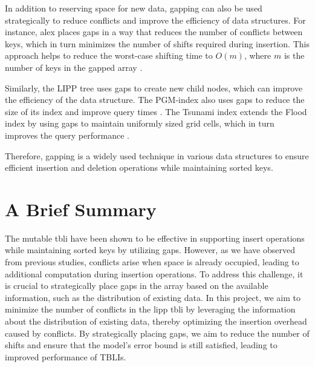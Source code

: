 In addition to reserving space for new data, gapping can also be used strategically to reduce conflicts and improve the efficiency of data structures. For instance, \acrshort{alex} places gaps in a way that reduces the number of conflicts between keys, which in turn minimizes the number of shifts required during insertion. This approach helps to reduce the worst-case shifting time to $O(m)$, where $m$ is the number of keys in the gapped array \cite{ALEX}.

Similarly, the LIPP tree \cite{LIPP} uses gaps to create new child nodes, which can improve the efficiency of the data structure. The PGM-index also uses gaps to reduce the size of its index and improve query times \cite{PGM}. The Tsunami index extends the Flood index by using gaps to maintain uniformly sized grid cells, which in turn improves the query performance \cite{Tsunami}.

Therefore, gapping is a widely used technique in various data structures to ensure efficient insertion and deletion operations while maintaining sorted keys.

\section{A Brief Summary}
The mutable \acrfull{tbli} have been shown to be effective in supporting insert operations while maintaining sorted keys by utilizing gaps. However, as we have observed from previous studies, conflicts arise when space is already occupied, leading to additional computation during insertion operations. To address this challenge, it is crucial to strategically place gaps in the array based on the available information, such as the distribution of existing data. In this project, we aim to minimize the number of conflicts in the \acrshort{lipp} \acrshort{tbli} by leveraging the information about the distribution of existing data, thereby optimizing the insertion overhead caused by conflicts. By strategically placing gaps, we aim to reduce the number of shifts and ensure that the model's error bound is still satisfied, leading to improved performance of TBLIs.

